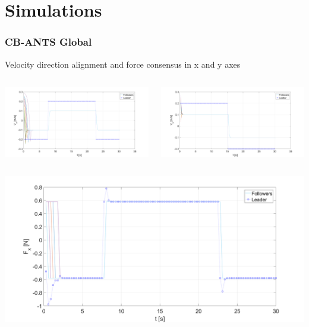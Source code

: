 \documentclass{beamer}
\begin{document}
\section{Simulations}
\begin{frame}
\frametitle{CB-ANTS Global}

Velocity direction alignment and force consensus in x and y axes

\begin{columns}[c] 
\centering
 \includegraphics[width=1\textwidth]{figures/CB_ANTS_Vx.png}

\centering
 \includegraphics[width=1\textwidth]{figures/CB_ANTS_Vy.png}
\end{columns}

\begin{columns}[c] 
\centering
 \includegraphics[width=1\textwidth]{figures/CB_ANTS_Fx.png}


\end{columns}
\end{frame}
\end{document}
